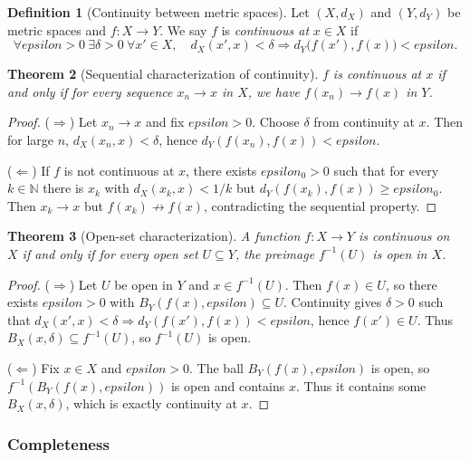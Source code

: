 \documentclass[12pt]{article}
\numberwithin{equation}{section}
\def\eps{epsilon}
\newcommand{\NN}{\mathbb{N}}
\newcommand{\eps}{\varepsilon}               %
\theoremstyle{plain}
\newtheorem{theorem}{Theorem}[section]
\theoremstyle{definition}
\newtheorem{definition}[theorem]{Definition}
\theoremstyle{remark}
\begin{document}
\begin{definition}[Continuity between metric spaces]\label{ms:def:continuity}
Let $(X,d_X)$ and $(Y,d_Y)$ be metric spaces and $f:X\to Y$.
We say $f$ is \emph{continuous at} $x\in X$ if
\[
\forall \eps>0\ \exists \delta>0\ \forall x'\in X,\quad
d_X(x',x)<\delta \Rightarrow d_Y\bigl(f(x'),f(x)\bigr)<\eps.
\]
\end{definition}

\begin{theorem}[Sequential characterization of continuity]\label{ms:thm:cont-seq}
$f$ is continuous at $x$ if and only if for every sequence $x_n\to x$ in $X$, we have $f(x_n)\to f(x)$ in $Y$.
\end{theorem}

\begin{proof}
($\Rightarrow$) Let $x_n\to x$ and fix $\eps>0$. Choose $\delta$ from continuity at $x$.
Then for large $n$, $d_X(x_n,x)<\delta$, hence $d_Y(f(x_n),f(x))<\eps$.

($\Leftarrow$) If $f$ is not continuous at $x$, there exists $\eps_0>0$ such that for every $k\in\NN$ there is $x_k$ with
$d_X(x_k,x)<1/k$ but $d_Y(f(x_k),f(x))\ge \eps_0$.
Then $x_k\to x$ but $f(x_k)\not\to f(x)$, contradicting the sequential property.
\end{proof}

\begin{theorem}[Open-set characterization]\label{ms:thm:cont-open-preimage}
A function $f:X\to Y$ is continuous on $X$ if and only if for every open set $U\subseteq Y$, the preimage $f^{-1}(U)$ is open in $X$.
\end{theorem}

\begin{proof}
($\Rightarrow$) Let $U$ be open in $Y$ and $x\in f^{-1}(U)$. Then $f(x)\in U$, so there exists $\eps>0$ with
$B_Y(f(x),\eps)\subseteq U$. Continuity gives $\delta>0$ such that
$d_X(x',x)<\delta\Rightarrow d_Y(f(x'),f(x))<\eps$, hence $f(x')\in U$.
Thus $B_X(x,\delta)\subseteq f^{-1}(U)$, so $f^{-1}(U)$ is open.

($\Leftarrow$) Fix $x\in X$ and $\eps>0$. The ball $B_Y(f(x),\eps)$ is open, so $f^{-1}(B_Y(f(x),\eps))$ is open and contains $x$.
Thus it contains some $B_X(x,\delta)$, which is exactly continuity at $x$.
\end{proof}

\subsubsection{Completeness}
\end{document}
